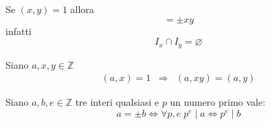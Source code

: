 \begin{theorem}
	Se $(x, y) = 1$ allora
	\begin{equation*}
		[x, y] = \pm xy
	\end{equation*}
	infatti
	\begin{equation*}
		I_x \cap I_y = \varnothing
	\end{equation*}
\end{theorem}

\begin{theorem}
	Siano $a, x, y \in \mathbb{Z}$
	\begin{equation*}
		\begin{array}{rcl}
			(a, x) = 1 & \Rightarrow & (a, xy) = (a, y)
		\end{array}
	\end{equation*}
\end{theorem}

\begin{observation}
	Siano $a, b, e \in \mathbb{Z}$ tre interi qualsiasi e $p$ un numero primo vale:
	\begin{equation*}
		a = \pm b \Leftrightarrow \forall p, e \; p^e \mid a \Leftrightarrow p^e \mid b
	\end{equation*}
\end{observation}